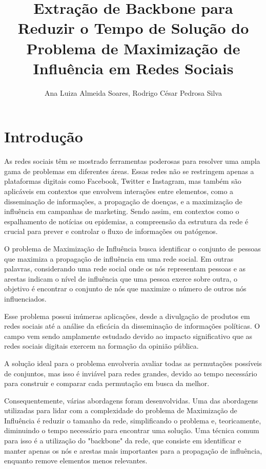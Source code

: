 \documentclass[12pt]{article}
\title{Extração de Backbone para Reduzir o Tempo de Solução do Problema de Maximização de Influência em Redes Sociais}
\author{Ana Luiza Almeida Soares\inst{1}, Rodrigo César Pedrosa Silva\inst{1}} %
\begin{document}
\maketitle %

     

\section{Introdução}

As redes sociais têm se mostrado ferramentas poderosas para resolver uma ampla gama de problemas em diferentes áreas. Essas redes não se restringem apenas a plataformas digitais como Facebook, Twitter e Instagram, mas também são aplicáveis em contextos que envolvem interações entre elementos, como a disseminação de informações, a propagação de doenças, e a maximização de influência em campanhas de marketing. Sendo assim, em contextos como o espalhamento de notícias ou epidemias, a compreensão da estrutura da rede é crucial para prever e controlar o fluxo de informações ou patógenos.

O problema de Maximização de Influência busca identificar o conjunto de pessoas que maximiza a propagação de influência em uma rede social. Em outras palavras, considerando uma rede social onde os nós representam pessoas e as arestas indicam o nível de influência que uma pessoa exerce sobre outra, o objetivo é encontrar o conjunto de nós que maximize o número de outros nós influenciados.

Esse problema possui inúmeras aplicações, desde a divulgação de produtos em redes sociais até a análise da eficácia da disseminação de informações políticas. O campo vem sendo amplamente estudado devido ao impacto significativo que as redes sociais digitais exercem na formação da opinião pública.

A solução ideal para o problema envolveria avaliar todas as permutações possíveis de conjuntos, mas isso é inviável para redes grandes, devido ao tempo necessário para construir e comparar cada permutação em busca da melhor. 

Consequentemente, várias abordagens foram desenvolvidas. Uma das abordagens utilizadas para lidar com a complexidade do problema de Maximização de Influência é reduzir o tamanho da rede, simplificando o problema e, teoricamente, diminuindo o tempo necessário para encontrar uma solução. Uma técnica comum para isso é a utilização do "backbone" da rede, que consiste em identificar e manter apenas os nós e arestas mais importantes para a propagação de influência, enquanto remove elementos menos relevantes.
\end{document}
